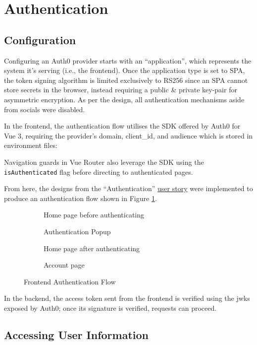 \section{Authentication}

\subsection{Configuration}

Configuring an Auth0 provider starts with an
\enquote{application}, which represents the system it's
serving (i.e., the frontend).
Once the application type is set to SPA, the token signing
algorithm is limited exclusively to RS256 since an
\gls{SPA} cannot store secrets in the browser, instead
requiring a public \& private key-pair for asymmetric
encryption. As per the design, all authentication
mechanisms aside from socials were disabled.

In the frontend, the authentication flow utilises the SDK
offered by Auth0 for Vue 3, requiring the provider's
domain, client\_id, and audience which is stored in
environment files:



Navigation guards in Vue Router also leverage the SDK using
the \lstinline{isAuthenticated} flag before directing to
authenticated pages.

From here, the designs from the \enquote{Authentication}
\hyperref[ss:stories]{user story} were implemented to
produce an authentication flow shown in Figure
\ref{fig:authFlow}.

\begin{figure}
  \centering

  \begin{subfigure}{\subfigwidth}
    \centering
    \caption{Home page before authenticating}
  \end{subfigure}
  \begin{subfigure}{\subfigwidth}
    \centering
    \caption{Authentication Popup}
  \end{subfigure}
  \begin{subfigure}{\subfigwidth}
    \centering
    \caption{Home page after authenticating}
  \end{subfigure}
  \begin{subfigure}{\subfigwidth}
    \centering
    \caption{Account page}
  \end{subfigure}

  \caption{Frontend Authentication Flow}
  \label{fig:authFlow}
\end{figure}

In the backend, the access token sent from the frontend is
verified using the \gls{jwks} exposed by Auth0; once its
signature is verified, requests can proceed. 

\subsection{Accessing User Information}
